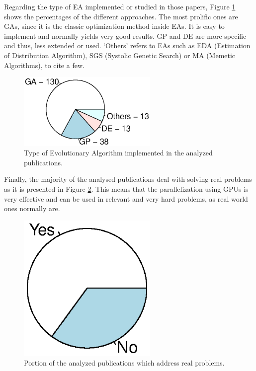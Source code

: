 \documentclass{article}
\begin{document}
Regarding the type of EA implemented or studied in those papers, Figure \ref{figure:type_algorithm} shows the percentages of the different approaches. The most prolific ones are GAs, since it is the classic optimization method inside EAs. It is easy to implement and normally yields very good results.  GP and DE are more specific and thus, less extended or used. `Others' refers to EAs such as EDA (Estimation of Distribution Algorithm), SGS (Systolic Genetic Search) or MA (Memetic Algorithms), to cite a few.

\begin{figure}[!ht]
\centering
\includegraphics[width=0.6\textwidth]{algorithmtype.eps}
\caption{Type of Evolutionary Algorithm implemented in the analyzed publications.}
\label{figure:type_algorithm}
\end{figure}

Finally, the majority of the analysed publications deal with solving real problems as it is presented in Figure \ref{figure:type_problem}. This means that the parallelization using GPUs is very effective and can be used in relevant and very hard problems, as real world ones normally are.

\begin{figure}[!ht]
\centering
\includegraphics[width=0.6\textwidth]{realproblem.eps}
\caption{Portion of the analyzed publications which address real problems.}
\label{figure:type_problem}
\end{figure}
\end{document}
